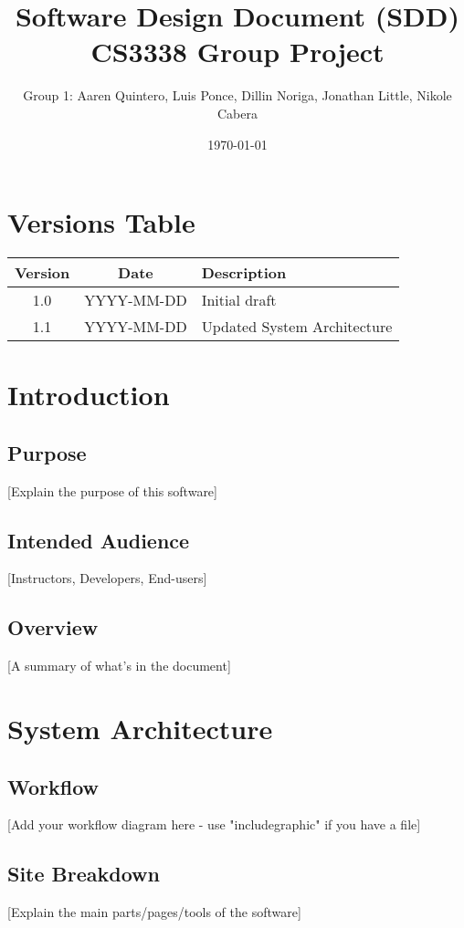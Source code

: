 \documentclass[12pt]{article}
\title{Software Design Document (SDD)\\\large CS3338 Group Project}
\author{Group 1: Aaren Quintero, Luis Ponce, Dillin Noriga, Jonathan Little, Nikole Cabera}
\date{\today}
\begin{document}
\maketitle

\tableofcontents
\newpage

\section*{Versions Table}
\begin{longtable}{|c|c|p{8cm}|}
\hline
\textbf{Version} & \textbf{Date} & \textbf{Description} \\
\hline
1.0 & YYYY-MM-DD & Initial draft \\
\hline
1.1 & YYYY-MM-DD & Updated System Architecture \\
\hline
\end{longtable}

\newpage

\section{Introduction}
\subsection{Purpose}
[Explain the purpose of this software]

\subsection{Intended Audience}
[Instructors, Developers, End-users]

\subsection{Overview}
[A summary of what's in the document]

\section{System Architecture}
\subsection{Workflow}
[Add your workflow diagram here - use "includegraphic" if you have a file]

\subsection{Site Breakdown}
[Explain the main parts/pages/tools of the software]
\end{document}
